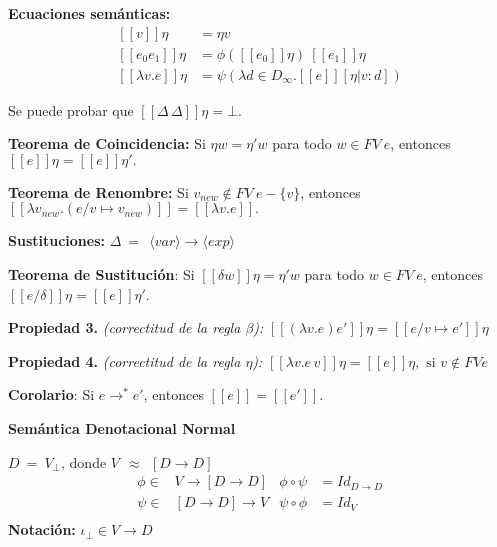 \documentclass[handout]{beamer}
\newcommand{\se}[1]{\mbox{$[\![#1]\!]$}}
\begin{document}
\smallskip


\textbf{Ecuaciones semánticas:}
\begin{align*}
    \se{v}\eta &= \eta v\\[1ex]
    \se{e_0 e_1}\eta &= \phi(\se{e_0}\eta)\ \se{e_1}\eta\\[1ex]
    \se{\lambda v.e}\eta &= \psi(\lambda d\in D_\infty. \se{e}[\eta|v:d])
\end{align*}

\smallskip

Se puede probar que $\se{\Delta\,\Delta}\eta = \bot$.

\textbf{Teorema de Coincidencia:}
Si $\eta w = \eta' w$ para todo $w\in FV\ e$, entonces
$\se{e}\eta = \se{e}\eta'.$

\smallskip

\textbf{Teorema de Renombre:} Si $v_{new}\notin FV\ e-\{v\}$,
entonces $\se{\lambda v_{new}.(e/v\mapsto v_{new})} = \se{\lambda v.e}.$ \pause

\smallskip

\textbf{Sustituciones:} $\Delta \ = \ \ \langle var\rangle \rightarrow  \langle exp\rangle$

\smallskip

\textbf{Teorema de Sustitución}: Si $\se{\delta w}\eta = \eta' w$ para todo $w \in FV\ e$, entonces $\se{e/\delta}\eta = \se{e}\eta'$.

\smallskip

\textbf{Propiedad 3.} \textit{(correctitud de la regla $\beta$):} $\se{(\lambda v.e)e'}\eta = \se{e/v\mapsto e'}\eta$

\smallskip

\textbf{Propiedad 4.} \textit{(correctitud de la regla $\eta$):} $\se{\lambda v.e\,v}\eta = \se{e}\eta, \text{ si } v\notin FV e$

\smallskip

\textbf{Corolario}: Si $e \rightarrow^\ast e'$, entonces $\se{e} = \se{e'}$.

\bigskip

\textbf{Semántica Denotacional Normal}

\smallskip
$D \ =\ V_\perp$, donde $V\ \ \approx\ \  [D\rightarrow D]$
\begin{align*}
\phi\in & V\rightarrow [D\rightarrow D] & \phi \circ \psi &= Id_{D\rightarrow D}\\
\psi\in &[D\rightarrow D] \rightarrow V & \psi\circ\phi &= Id_{V} \\
\end{align*}
\textbf{Notación: } $ \iota_\perp\in V\rightarrow D $
\end{document}
